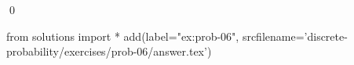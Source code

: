 
\begin{ex} 
  \label{ex:prob-06}
  
  \qed
\end{ex} 
\begin{python0}
from solutions import *
add(label="ex:prob-06",
    srcfilename='discrete-probability/exercises/prob-06/answer.tex') 
\end{python0}
